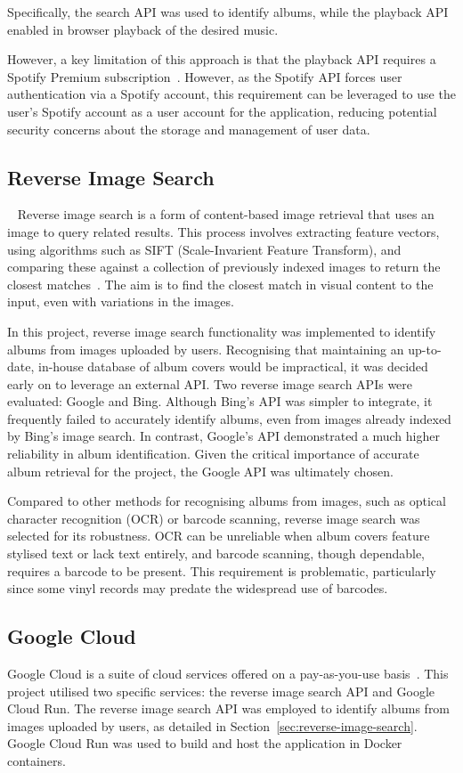 Specifically, the search API was used to identify albums, while the playback API enabled in browser playback of the desired music.

However, a key limitation of this approach is that the playback API requires a Spotify Premium subscription~\cite{SpotifyPlaybackSDK}. However, as the Spotify API forces user authentication via a Spotify account, this requirement can be leveraged to use the user's Spotify account as a user account for the application, reducing potential security concerns about the storage and management of user data.

\subsection{Reverse Image Search}~\label{sec:reverse-image-search}
Reverse image search is a form of content-based image retrieval that uses an image to query related results. This process involves extracting feature vectors, using algorithms such as SIFT (Scale-Invarient Feature Transform), and comparing these against a collection of previously indexed images to return the closest matches~\cite{Gaillard2017LargeSR}. The aim is to find the closest match in visual content to the input, even with variations in the images.

In this project, reverse image search functionality was implemented to identify albums from images uploaded by users. Recognising that maintaining an up-to-date, in-house database of album covers would be impractical, it was decided early on to leverage an external API. Two reverse image search APIs were evaluated: Google and Bing. Although Bing's API was simpler to integrate, it frequently failed to accurately identify albums, even from images already indexed by Bing's image search. In contrast, Google's API demonstrated a much higher reliability in album identification. Given the critical importance of accurate album retrieval for the project, the Google API was ultimately chosen.

Compared to other methods for recognising albums from images, such as optical character recognition (OCR) or barcode scanning, reverse image search was selected for its robustness. OCR can be unreliable when album covers feature stylised text or lack text entirely, and barcode scanning, though dependable, requires a barcode to be present. This requirement is problematic, particularly since some vinyl records may predate the widespread use of barcodes.

\subsection{Google Cloud}
Google Cloud is a suite of cloud services offered on a pay-as-you-use basis~\cite{GCP}. This project utilised two specific services: the reverse image search API and Google Cloud Run. The reverse image search API was employed to identify albums from images uploaded by users, as detailed in Section~\ref{sec:reverse-image-search}. Google Cloud Run was used to build and host the application in Docker containers.

